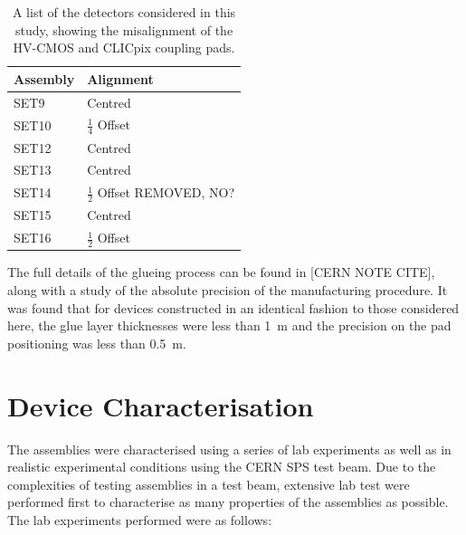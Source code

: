 \begin{table}[h!]
\centering
\begin{tabular}{ l l }
\hline
Assembly & Alignment \\ 
\hline
SET9 & Centred \\
SET10 & $\frac{1}{4}$ Offset \\
SET12 & Centred \\
SET13 & Centred \\
SET14 & $\frac{1}{2}$ Offset REMOVED, NO?\\
SET15 & Centred \\
SET16 & $\frac{1}{2}$ Offset \\
\hline
\end{tabular}
\caption[A list of the detectors considered in this study, showing the misalignment of the HV-CMOS and CLICpix coupling pads.]{A list of the detectors considered in this study, showing the misalignment of the HV-CMOS and CLICpix coupling pads.}
\label{table:alignment}
\end{table}


The full details of the glueing process can be found in [CERN NOTE CITE], along with a study of the absolute precision of the manufacturing procedure.  It was found that for devices constructed in an identical fashion to those considered here, the glue layer thicknesses were less than 1~{\mu}m and the precision on the pad positioning was less than 0.5~{\mu}m.  


\section{Device Characterisation}


The assemblies were characterised using a series of lab experiments as well as in realistic experimental conditions using the CERN SPS test beam.  Due to the complexities of testing assemblies in a test beam, extensive lab test were performed first to characterise as many properties of the assemblies as possible.  The lab experiments performed were as follows:

